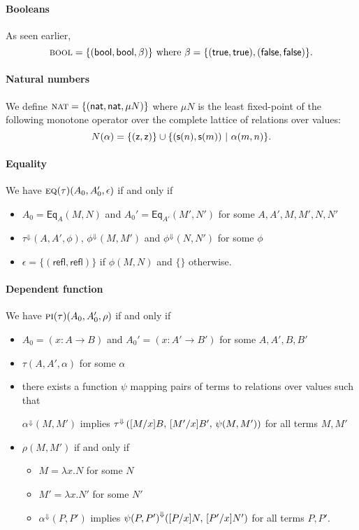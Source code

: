 \documentclass{article} \usepackage{chtt-notes} \usepackage{stmaryrd}
\newcommand{\lift}[1]{{#1}^{\Downarrow}}
\begin{document}
\paragraph{Booleans}
As seen earlier,
\[ \textsc{bool} = \{(\mathsf{bool}, \mathsf{bool}, \beta)\} \text{ where } \beta =
  \{(\mathsf{true}, \mathsf{true}), (\mathsf{false}, \mathsf{false})\}. \]

\paragraph{Natural numbers}
We define $ \textsc{nat} = \{(\mathsf{nat}, \mathsf{nat}, \mu N)\} $ where $\mu N$ is
the least fixed-point of the following monotone operator over the
complete lattice of relations over values:
\[ N(\alpha) = \{(\mathsf{z}, \mathsf{z})\} \cup \{ (\mathsf{s}(n), \mathsf{s}(m)) \ | \
  \alpha(m,n) \}. \]

\paragraph{Equality}
We have $\textsc{eq}(\tau)(A_0, A'_0, \epsilon)$ if and only if
\begin{itemize}
\item $A_0 = \textsf{Eq}_A(M, N)$ and
  $A_0' = \textsf{Eq}_{A'}(M', N')$ for some $A, A', M, M', N, N'$
\item $\lift{\tau}(A, A', \phi)$, $\lift{\phi}(M, M')$ and
  $\lift{\phi}(N, N')$ for some $\phi$
\item $\epsilon = \{(\textsf{refl}, \textsf{refl})\}$ if $\phi(M,N)$
  and $\{\}$ otherwise.
\end{itemize}

\paragraph{Dependent function}
We have $\textsc{pi}(\tau)(A_0, A'_0, \rho)$ if and only if
\begin{itemize}
\item $A_0 = (x:A \to B)$ and $A_0' = (x:A' \to B')$ for some
  $A,A',B,B'$
\item $\tau(A, A', \alpha)$ for some $\alpha$
\item there exists a function $\psi$ mapping pairs of terms to
  relations over values such that
  \begin{center}
    $\lift{\alpha}(M, M')$ implies
    $\lift{\tau}\left(\subst{M}{x}{B}, \, \subst{M'}{x}{B'}, \,
      \psi(M,M')\right)$ for all terms $M, M'$
  \end{center}
\item $\rho(M, M')$ if and only if
  \begin{itemize}
  \item $M = \lambda x. N$ for some $N$
  \item $M' = \lambda x. N'$ for some $N'$
  \item $\lift{\alpha}(P, P')$ implies
    $\lift{\psi(P, P')}(\subst{P}{x}{N}, \, \subst{P'}{x}{N'})$ for
    all terms $P, P'$.
  \end{itemize}
\end{itemize}
\end{document}
